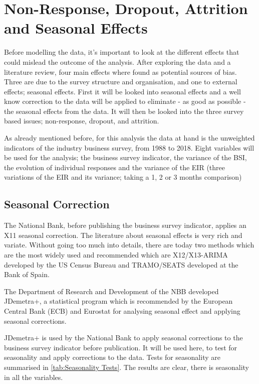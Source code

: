 \documentclass[12pt,a4paper,oneside]{book}
\begin{document}
\chapter{Non-Response, Dropout, Attrition and Seasonal Effects}
\label{chap:nonresponse dropout}

Before modelling the data, it's important to look at the different effects that could mislead the outcome of the analysis. After exploring the data and a literature review, four main effects where found as potential sources of bias. Three are due to the survey structure and organisation, and one to external effects; seasonal effects. First it will be looked into seasonal effects and a well know correction to the data will be applied to eliminate - as good as possible - the seasonal effects from the data.
It will then be looked into the three survey based issues; non-response, dropout, and attrition.

As already mentioned before, for this analysis the data at hand is the unweighted indicators of the industry business survey, from 1988 to 2018.
Eight variables will be used for the analysis; the business survey indicator, the variance of the BSI, the evolution of individual responses and the variance of the EIR (three variations of the EIR and its variance; taking a 1, 2 or 3 months comparison) 

\section{Seasonal Correction}
\label{sec:seasonal correction}

The National Bank, before publishing the business survey indicator, applies an X11 seasonal correction.
The literature about seasonal effects is very rich and variate. Without going too much into details, there are today two methods which are the most widely used and recommended which are X12/X13-ARIMA developed by the US Census Bureau and TRAMO/SEATS developed at the Bank of Spain. 

The Department of Research and Development of the NBB developed JDemetra+, a statistical program which is recommended by the European Central Bank (ECB) and Eurostat for analysing seasonal effect and applying seasonal corrections. 

JDemetra+ is used by the National Bank to apply seasonal corrections to the business survey indicator before publication. It will be used here, to test for seasonality and apply corrections to the data.
Tests for seasonality are summarised in \autoref{tab:Seasonality Tests}. The results are clear, there is seasonality in all the variables.
\end{document}
